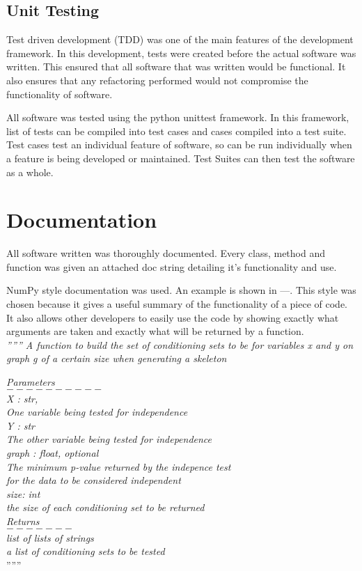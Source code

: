 \documentclass{UoYCSproject}
\begin{document}
\subsection{Unit Testing}
Test driven development (TDD) was one of the main features of the development framework. In this development, tests were created before the actual software was written. This ensured that all software that was written would be functional. It also ensures that any refactoring performed would not compromise the functionality of software.

All software was tested using the python unittest framework. In this framework, list of tests can be compiled into test cases and cases compiled into a test suite. Test cases test an individual feature of software, so can be run individually when a feature is being developed or maintained. Test Suites can then test the software as a whole.

\section{Documentation}
All software written was thoroughly documented. Every class, method and function was given an attached doc string detailing it's functionality and use.

NumPy style documentation was used. An example is shown in ---. This style was chosen because it gives a useful summary of the functionality of a piece of code. It also allows other developers to easily use the code by showing exactly what arguments are taken and exactly what will be returned by a function.\\

\textit{ '''''' A  function to build the set of conditioning sets to be for variables x and y
	on graph g of a certain size when generating a skeleton}

\textit{Parameters\\
	$ 	---------- $\\
	X : str, \\
	One variable being tested for independence\\ 
	Y : str\\
	The other variable being tested for independence\\
	graph : float, optional\\
	The minimum p-value returned by the indepence test\\
	for the data to be considered independent\\
	size: int\\
	the size of each conditioning set to be returned\\
	Returns\\
	$ ------- $\\
	list of lists of strings\\
	a list of conditioning sets to be tested\\}
''''''\\
\end{document}
